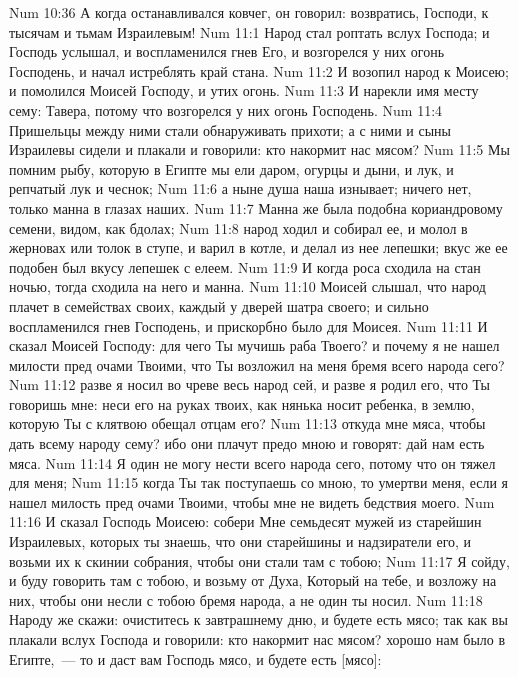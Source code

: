 \vs Num 10:36 А когда останавливался ковчег, он говорил: возвратись, Господи, к тысячам и тьмам Израилевым!
\vs Num 11:1 Народ стал роптать вслух Господа; и Господь услышал, и воспламенился гнев Его, и возгорелся у них огонь Господень, и начал истреблять край стана.
\vs Num 11:2 И возопил народ к Моисею; и помолился Моисей Господу, и утих огонь.
\vs Num 11:3 И нарекли имя месту сему: Тавера, потому что возгорелся у них огонь Господень.
\vs Num 11:4 Пришельцы между ними стали обнаруживать прихоти; а с ними и сыны Израилевы сидели и плакали и говорили: кто накормит нас мясом?
\vs Num 11:5 Мы помним рыбу, которую в Египте мы ели даром, огурцы и дыни, и лук, и репчатый лук и чеснок;
\vs Num 11:6 а ныне душа наша изнывает; ничего нет, только манна в глазах наших.
\vs Num 11:7 Манна же была подобна кориандровому семени, видом, как бдолах;
\vs Num 11:8 народ ходил и собирал ее, и молол в жерновах или толок в ступе, и варил в котле, и делал из нее лепешки; вкус же ее подобен был вкусу лепешек с елеем.
\vs Num 11:9 И когда роса сходила на стан ночью, тогда сходила на него и манна.
\vs Num 11:10 Моисей слышал, что народ плачет в семействах своих, каждый у дверей шатра своего; и сильно воспламенился гнев Господень, и прискорбно было для Моисея.
\vs Num 11:11 И сказал Моисей Господу: для чего Ты мучишь раба Твоего? и почему я не нашел милости пред очами Твоими, что Ты возложил на меня бремя всего народа сего?
\vs Num 11:12 разве я носил во чреве весь народ сей, и разве я родил его, что Ты говоришь мне: неси его на руках твоих, как нянька носит ребенка, в землю, которую Ты с клятвою обещал отцам его?
\vs Num 11:13 откуда мне  мяса, чтобы дать всему народу сему? ибо они плачут предо мною и говорят: дай нам есть мяса.
\vs Num 11:14 Я один не могу нести всего народа сего, потому что он тяжел для меня;
\vs Num 11:15 когда Ты так поступаешь со мною, то  умертви меня, если я нашел милость пред очами Твоими, чтобы мне не видеть бедствия моего.
\rsbpar\vs Num 11:16 И сказал Господь Моисею: собери Мне семьдесят мужей из старейшин Израилевых, которых ты знаешь, что они старейшины и надзиратели его, и возьми их к скинии собрания, чтобы они стали там с тобою;
\vs Num 11:17 Я сойду, и буду говорить там с тобою, и возьму от Духа, Который на тебе, и возложу на них, чтобы они несли с тобою бремя народа, а не один ты носил.
\vs Num 11:18 Народу же скажи: очиститесь к завтрашнему дню, и будете есть мясо; так как вы плакали вслух Господа и говорили: кто накормит нас мясом? хорошо нам было в Египте,~--- то и даст вам Господь мясо, и будете есть [мясо]:
